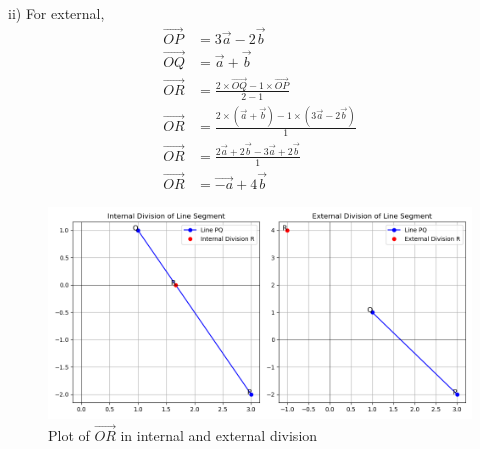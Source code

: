 \documentclass[journal]{IEEEtran}
\begin{document}
ii) For external,\\
\begin{align*}
\overrightarrow{OP} &= 3\overrightarrow{a} - 2\overrightarrow{b} \\
\overrightarrow{OQ} &= \overrightarrow{a} + \overrightarrow{b} \\
\overrightarrow{OR} &= \frac{2 \times \overrightarrow{OQ} - 1 \times \overrightarrow{OP}}{2 - 1} \\
\overrightarrow{OR} &= \frac{2 \times (\overrightarrow{a} + \overrightarrow{b}) - 1 \times (3\overrightarrow{a} - 2\overrightarrow{b})}{1} \\
\overrightarrow{OR} &= \frac{2\overrightarrow{a} + 2\overrightarrow{b} - 3\overrightarrow{a} + 2\overrightarrow{b}}{1} \\
\overrightarrow{OR} &= \overrightarrow{-a} + 4\overrightarrow{b}
\end{align*}

\begin{figure}[ht]
   \centering
   \includegraphics[width=0.7\linewidth]{figs/plot.png}
   \caption{Plot of $\overrightarrow{OR}$ in internal and external division}
   \label{fig:1}
\end{figure}
\end{document}
